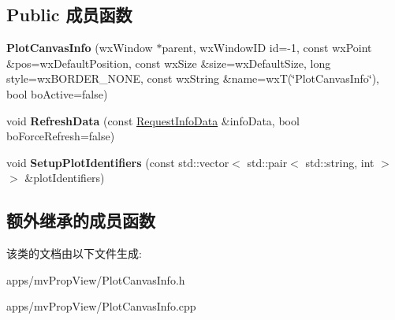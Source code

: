 \subsection*{Public 成员函数}
\begin{DoxyCompactItemize}
\item 
\hypertarget{class_plot_canvas_info_a6ca1b54aefc689684751b13f84ff5ed6}{{\bfseries Plot\+Canvas\+Info} (wx\+Window $\ast$parent, wx\+Window\+I\+D id=-\/1, const wx\+Point \&pos=wx\+Default\+Position, const wx\+Size \&size=wx\+Default\+Size, long style=wx\+B\+O\+R\+D\+E\+R\+\_\+\+N\+O\+N\+E, const wx\+String \&name=wx\+T(\char`\"{}Plot\+Canvas\+Info\char`\"{}), bool bo\+Active=false)}\label{class_plot_canvas_info_a6ca1b54aefc689684751b13f84ff5ed6}

\item 
\hypertarget{class_plot_canvas_info_abe6287b7b7eccc5824bcc1de52aea36e}{void {\bfseries Refresh\+Data} (const \hyperlink{struct_request_info_data}{Request\+Info\+Data} \&info\+Data, bool bo\+Force\+Refresh=false)}\label{class_plot_canvas_info_abe6287b7b7eccc5824bcc1de52aea36e}

\item 
\hypertarget{class_plot_canvas_info_a4f10e4d08d3fcc65ec71ca47257036f8}{void {\bfseries Setup\+Plot\+Identifiers} (const std\+::vector$<$ std\+::pair$<$ std\+::string, int $>$ $>$ \&plot\+Identifiers)}\label{class_plot_canvas_info_a4f10e4d08d3fcc65ec71ca47257036f8}

\end{DoxyCompactItemize}
\subsection*{额外继承的成员函数}


该类的文档由以下文件生成\+:\begin{DoxyCompactItemize}
\item 
apps/mv\+Prop\+View/Plot\+Canvas\+Info.\+h\item 
apps/mv\+Prop\+View/Plot\+Canvas\+Info.\+cpp\end{DoxyCompactItemize}
